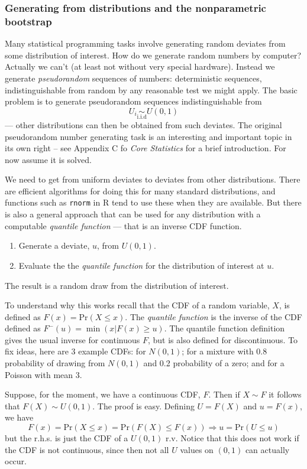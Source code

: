 \documentclass[10pt] {article}
\newcommand{\eps}[3]
{{\begin{center}
 \rotatebox{#1}{\scalebox{#2}{\texttt{[image: \#3]}}}
 \end{center}}
}
\theoremstyle{definition}
\begin{document}
\subsubsection{Generating from distributions and the nonparametric bootstrap}

Many statistical programming tasks involve generating random deviates from some distribution of interest. How do we generate random numbers by computer? Actually we can't (at least not without very special hardware). Instead we generate {\em pseudorandom} sequences of numbers: deterministic sequences, indistinguishable from random by any reasonable test we might apply. The basic problem is to generate pseudorandom sequences indistinguishable from $$U_i \underset{\text{i.i.d}}{\sim} U(0,1)$$ --- other distributions can then be obtained from such deviates. The original pseudorandom number generating task is an interesting and important topic in its own right -- see Appendix C fo {\em Core Statistics} for a brief introduction. For now assume it is solved.

We need to get from uniform deviates to deviates from other distributions. There are efficient algorithms for doing this for many standard distributions, and functions such as {\tt rnorm} in R tend to use these when they are available. But there is also a general approach that can be used for any distribution with a computable {\em quantile function} --- that is an inverse CDF function.   
\begin{enumerate}
\item Generate a deviate, $u$, from $U(0,1)$.
\item Evaluate the the {\em quantile function} for the distribution of interest at $u$.
\end{enumerate}
The result is a random draw from the distribution of interest.

To understand why this works recall that the CDF of a random variable, $X$, is defined as $F(x) = \text{Pr}(X \le x)$. The {\em quantile function} is the inverse of the CDF defined as $F^-(u) = \min(x|F(x) \ge u)$. The quantile function definition gives the usual inverse for continuous $F$, but is also defined for discontinuous. To fix ideas, here are 3 example CDFs: for $N(0,1)$; for a mixture with 0.8 probability of drawing from $N(0,1)$ and 0.2 probability of a zero; and for a Poisson with mean 3. 
\eps{-90}{.5}{cdf.eps}
Suppose, for the moment, we have a continuous CDF, $F$. Then if $X \sim F$ it follows that $F(X)\sim U(0,1)$. The proof is easy. Defining $U = F(X) $ and $u = F(x)$, we have
$$ F(x) = \text{Pr}(X \le x) =  \text{Pr}(F(X) \le F(x)) \Rightarrow u = \text{Pr}(U \le u)$$
but the r.h.s. is just the CDF of a $U(0,1)$ r.v. Notice that this does not work if the CDF is not continuous, since then not all $U$ values on $(0,1)$ can actually occur. 
\end{document}
